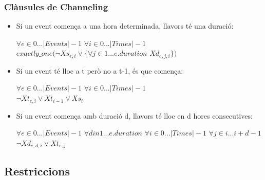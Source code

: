 \documentclass[11pt]{beamer}
\begin{document}
  \begin{frame}
  \frametitle{Clàusules de Channeling}  

  \begin{itemize}
    \item Si un event comença a una hora determinada, llavors té una duració: \begin{center} $\forall e \in 0 ... |Events|-1$ $\forall i \in 0 ... |Times|-1$ \\$exactly\_one(\neg Xs_{e,i} \vee \{ \forall j \in 1 ... e.duration$ $Xd_{e,j,i}\})$\end{center}
    \item Si un event té lloc a t però no a t-1, és que comença: \begin{center} $\forall e \in 0 ... |Events|-1$ $\forall i \in 0 ... |Times|-1$ \\$\neg Xt_{e,i} \vee Xt_{i-1} \vee Xs_i$ \end{center}
    \item Si un event comença amb duració d, llavors té lloc en d hores consecutives: \begin{center} 
      $\forall e \in 0 ... |Events|-1$ $\forall d in 1 ... e.duration$ $\forall i \in 0 ... |Times|-1$ $\forall j \in i ... i+d-1$ \\
      $\neg Xd_{e,d,i} \vee Xt_{e,j}$    
    \end{center}
  \end{itemize}

  \end{frame}

  \subsection{Restriccions}
\end{document}
